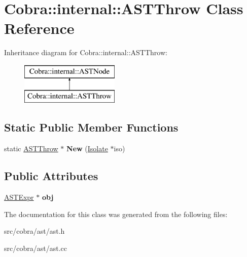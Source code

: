 \hypertarget{class_cobra_1_1internal_1_1_a_s_t_throw}{\section{Cobra\+:\+:internal\+:\+:A\+S\+T\+Throw Class Reference}
\label{class_cobra_1_1internal_1_1_a_s_t_throw}
}
Inheritance diagram for Cobra\+:\+:internal\+:\+:A\+S\+T\+Throw\+:\begin{figure}[H]
\begin{center}
\leavevmode
\includegraphics[height=2.000000cm]{class_cobra_1_1internal_1_1_a_s_t_throw}
\end{center}
\end{figure}
\subsection*{Static Public Member Functions}
\begin{DoxyCompactItemize}
\item 
\hypertarget{class_cobra_1_1internal_1_1_a_s_t_throw_a046442eb9f93b9de91844c41852f6a46}{static \hyperlink{class_cobra_1_1internal_1_1_a_s_t_throw}{A\+S\+T\+Throw} $\ast$ {\bfseries New} (\hyperlink{class_cobra_1_1internal_1_1_isolate}{Isolate} $\ast$iso)}\label{class_cobra_1_1internal_1_1_a_s_t_throw_a046442eb9f93b9de91844c41852f6a46}

\end{DoxyCompactItemize}
\subsection*{Public Attributes}
\begin{DoxyCompactItemize}
\item 
\hypertarget{class_cobra_1_1internal_1_1_a_s_t_throw_adecf8b89c1c8aa6156737cb3b378b5cc}{\hyperlink{class_cobra_1_1internal_1_1_a_s_t_expr}{A\+S\+T\+Expr} $\ast$ {\bfseries obj}}\label{class_cobra_1_1internal_1_1_a_s_t_throw_adecf8b89c1c8aa6156737cb3b378b5cc}

\end{DoxyCompactItemize}


The documentation for this class was generated from the following files\+:\begin{DoxyCompactItemize}
\item 
src/cobra/ast/ast.\+h\item 
src/cobra/ast/ast.\+cc\end{DoxyCompactItemize}
